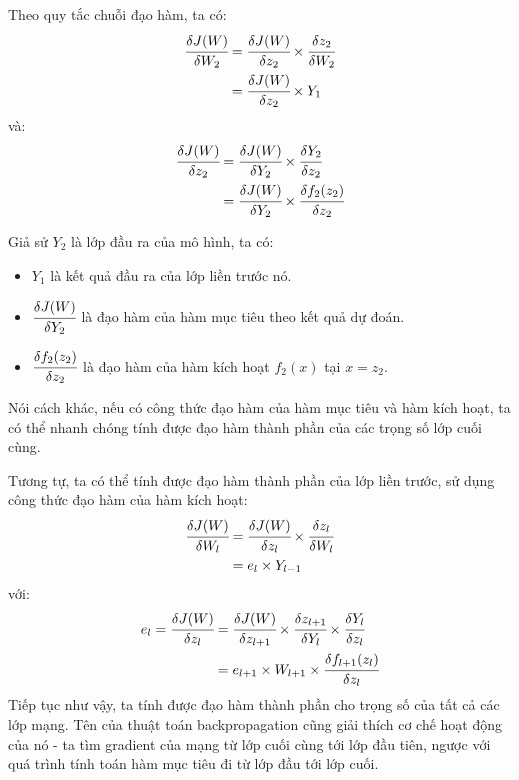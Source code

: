 \documentclass[12pt]{extreport}
\begin{document}
Theo quy tắc chuỗi đạo hàm, ta có:
\begin{align*}
    \cfrac{\delta J(W)}{\delta W_2} & = \cfrac{\delta J(W)}{\delta z_2} \times \cfrac{\delta z_2}{\delta W_2} \\
                                    & = \cfrac{\delta J(W)}{\delta z_2} \times Y_1
\end{align*}
và:
\begin{align*}
    \cfrac{\delta J(W)}{\delta z_2} & = \cfrac{\delta J(W)}{\delta Y_2} \times \cfrac{\delta Y_2}{\delta z_2}      \\
                                    & = \cfrac{\delta J(W)}{\delta Y_2} \times \cfrac{\delta f_2(z_2)}{\delta z_2}
\end{align*}

Giả sử $ Y_2 $ là lớp đầu ra của mô hình, ta có:
\begin{itemize}
    \item $ Y_1 $ là kết quả đầu ra của lớp liền trước nó.
    \item $ \cfrac{\delta J(W)}{\delta Y_2} $ là đạo hàm của hàm mục tiêu theo kết quả dự đoán.
    \item $ \cfrac{\delta f_2(z_2)}{\delta z_2} $ là đạo hàm của hàm kích hoạt $ f_2(x) $ tại $ x = z_2 $.
\end{itemize}

Nói cách khác, nếu có công thức đạo hàm của hàm mục tiêu và hàm kích hoạt, ta có thể nhanh chóng tính được đạo hàm thành phần của các trọng số lớp cuối cùng.

Tương tự, ta có thể tính được đạo hàm thành phần của lớp liền trước, sử dụng công thức đạo hàm của hàm kích hoạt:
\begin{align*}
    \cfrac{\delta J(W)}{\delta W_l} & = \cfrac{\delta J(W)}{\delta z_l} \times \cfrac{\delta z_l}{\delta W_l} \\
                                    & = e_l \times Y_{l - 1}
\end{align*}
với:
\begin{align*}
    e_l = \cfrac{\delta J(W)}{\delta z_l} & = \cfrac{\delta J(W)}{\delta z_{l + 1}} \times \cfrac{\delta z_{l + 1}}{\delta Y_l} \times \cfrac{\delta Y_l}{\delta z_l} \\
                                          & = e_{l + 1} \times W_{l + 1} \times \cfrac{\delta f_{l + 1}(z_l)}{\delta z_l}
\end{align*}
Tiếp tục như vậy, ta tính được đạo hàm thành phần cho trọng số của tất cả các lớp mạng. Tên của thuật toán backpropagation cũng giải thích cơ chế hoạt động của nó - ta tìm gradient của mạng từ lớp cuối cùng tới lớp đầu tiên, ngược với quá trình tính toán hàm mục tiêu đi từ lớp đầu tới lớp cuối.
\end{document}

